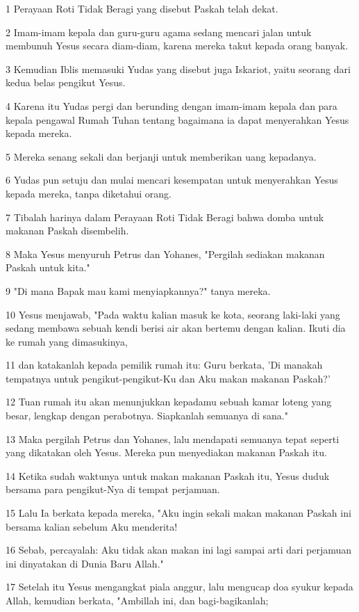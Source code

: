 \par 1 Perayaan Roti Tidak Beragi yang disebut Paskah telah dekat.
\par 2 Imam-imam kepala dan guru-guru agama sedang mencari jalan untuk membunuh Yesus secara diam-diam, karena mereka takut kepada orang banyak.
\par 3 Kemudian Iblis memasuki Yudas yang disebut juga Iskariot, yaitu seorang dari kedua belas pengikut Yesus.
\par 4 Karena itu Yudas pergi dan berunding dengan imam-imam kepala dan para kepala pengawal Rumah Tuhan tentang bagaimana ia dapat menyerahkan Yesus kepada mereka.
\par 5 Mereka senang sekali dan berjanji untuk memberikan uang kepadanya.
\par 6 Yudas pun setuju dan mulai mencari kesempatan untuk menyerahkan Yesus kepada mereka, tanpa diketahui orang.
\par 7 Tibalah harinya dalam Perayaan Roti Tidak Beragi bahwa domba untuk makanan Paskah disembelih.
\par 8 Maka Yesus menyuruh Petrus dan Yohanes, "Pergilah sediakan makanan Paskah untuk kita."
\par 9 "Di mana Bapak mau kami menyiapkannya?" tanya mereka.
\par 10 Yesus menjawab, "Pada waktu kalian masuk ke kota, seorang laki-laki yang sedang membawa sebuah kendi berisi air akan bertemu dengan kalian. Ikuti dia ke rumah yang dimasukinya,
\par 11 dan katakanlah kepada pemilik rumah itu: Guru berkata, 'Di manakah tempatnya untuk pengikut-pengikut-Ku dan Aku makan makanan Paskah?'
\par 12 Tuan rumah itu akan menunjukkan kepadamu sebuah kamar loteng yang besar, lengkap dengan perabotnya. Siapkanlah semuanya di sana."
\par 13 Maka pergilah Petrus dan Yohanes, lalu mendapati semuanya tepat seperti yang dikatakan oleh Yesus. Mereka pun menyediakan makanan Paskah itu.
\par 14 Ketika sudah waktunya untuk makan makanan Paskah itu, Yesus duduk bersama para pengikut-Nya di tempat perjamuan.
\par 15 Lalu Ia berkata kepada mereka, "Aku ingin sekali makan makanan Paskah ini bersama kalian sebelum Aku menderita!
\par 16 Sebab, percayalah: Aku tidak akan makan ini lagi sampai arti dari perjamuan ini dinyatakan di Dunia Baru Allah."
\par 17 Setelah itu Yesus mengangkat piala anggur, lalu mengucap doa syukur kepada Allah, kemudian berkata, "Ambillah ini, dan bagi-bagikanlah;
